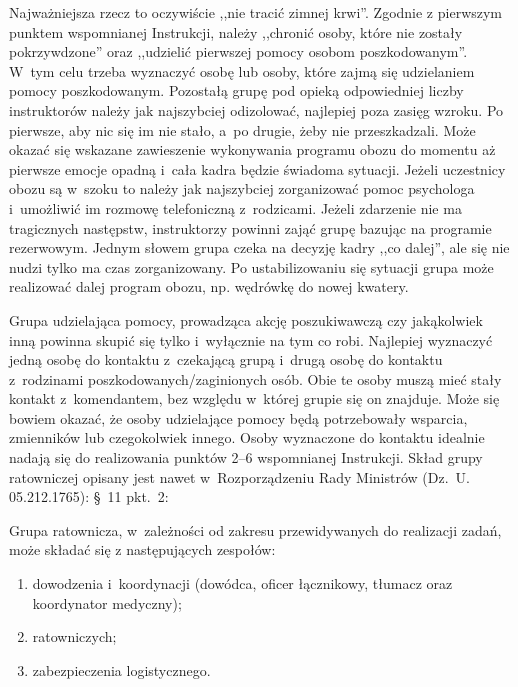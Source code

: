 \documentclass[a5paper,10pt,titlepage,twoside]{article}
\begin{document}
Najważniejsza rzecz to oczywiście ,,nie tracić zimnej krwi''. Zgodnie z pierwszym punktem wspomnianej Instrukcji, należy ,,chronić osoby, które nie zostały pokrzywdzone'' oraz ,,udzielić pierwszej pomocy osobom poszkodowanym''. W~tym celu trzeba wyznaczyć osobę lub osoby, które zajmą się udzielaniem pomocy poszkodowanym. Pozostałą grupę pod opieką odpowiedniej liczby instruktorów należy jak najszybciej odizolować, najlepiej poza zasięg wzroku. Po pierwsze, aby nic się im nie stało, a~po drugie, żeby nie przeszkadzali. Może okazać się wskazane zawieszenie wykonywania programu obozu do momentu aż pierwsze emocje opadną i~cała kadra będzie świadoma sytuacji. Jeżeli uczestnicy obozu są w~szoku to należy jak najszybciej zorganizować pomoc psychologa i~umożliwić im rozmowę telefoniczną z~rodzicami. Jeżeli zdarzenie nie ma tragicznych następstw, instruktorzy powinni zająć grupę bazując na programie rezerwowym. Jednym słowem grupa czeka na decyzję kadry ,,co dalej'', ale się nie nudzi tylko ma czas zorganizowany. Po ustabilizowaniu się sytuacji grupa może realizować dalej program obozu, np. wędrówkę do nowej kwatery.

Grupa udzielająca pomocy, prowadząca akcję poszukiwawczą czy jakąkolwiek inną powinna skupić się tylko i~wyłącznie na tym co robi. Najlepiej wyznaczyć jedną osobę do kontaktu z~czekającą grupą i~drugą osobę do kontaktu z~rodzinami poszkodowanych/zaginionych osób. Obie te osoby muszą mieć stały kontakt z~komendantem, bez względu w~której grupie się on znajduje. Może się bowiem okazać, że osoby udzielające pomocy będą potrzebowały wsparcia, zmienników lub czegokolwiek innego. Osoby wyznaczone do kontaktu idealnie nadają się do realizowania punktów 2--6 wspomnianej Instrukcji. Skład grupy ratowniczej opisany jest nawet w~Rozporządzeniu Rady Ministrów (Dz.~U. 05.212.1765): \S~11 pkt.~2:

Grupa ratownicza, w~zależności od zakresu przewidywanych do realizacji zadań, może składać się z następujących zespołów:
\begin{enumerate}
\item dowodzenia i~koordynacji (dowódca, oficer łącznikowy, tłumacz oraz koordynator medyczny);
\item ratowniczych;
\item zabezpieczenia logistycznego.
\end{enumerate}
\end{document}
